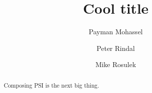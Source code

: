 \documentclass[11pt,letterpaper]{article}
\title{Cool title}
\author{Payman Mohassel \and Peter Rindal \and Mike Rosulek }
\begin{document}
\maketitle

\begin{abstract}
Composing PSI is the next big thing.
\end{abstract}















\end{document}
